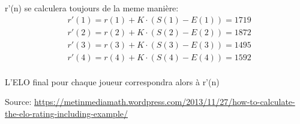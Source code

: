 \documentclass[11pt]{article}
\theoremstyle{definition}
\begin{document}
        r'(n) se calculera toujours de la meme manière:
        \begin{equation}
            \begin{split}
                & r'(1) = r(1) + K \cdot (S(1) - E(1)) = 1719 \\
                & r'(2) = r(2) + K \cdot (S(2) - E(2)) = 1872 \\
                & r'(3) = r(3) + K \cdot (S(3) - E(3)) = 1495 \\
                & r'(4) = r(4) + K \cdot (S(4) - E(4)) = 1592 \\
            \end{split}
        \end{equation}

        L'ELO final pour chaque joueur correspondra alors à r'(n)

            Source: \url{https://metinmediamath.wordpress.com/2013/11/27/how-to-calculate-the-elo-rating-including-example/}
\end{document}
